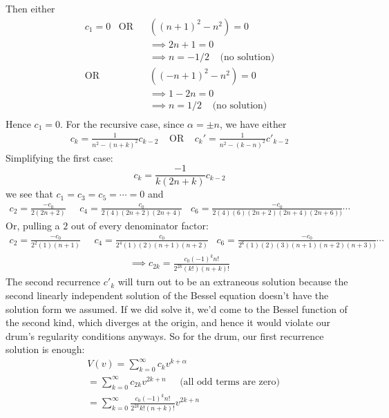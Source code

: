 \documentclass[12pt]{article}
\begin{document}
\begin{enumerate}[(a)]
{Then either
\begin{align*}
c_1 = 0 \;\;\; \text{OR} \;\;\; & ((n + 1)^2 - n^2) = 0\\
& \implies 2n + 1 = 0 \\
& \implies n = -1/2 \;\;\;\; \text{(no solution)} \\
\text{OR} \;\;\;& ((-n + 1)^2 - n^2) = 0 \\
& \implies 1 - 2n = 0 \\
& \implies n = 1/2\;\;\;\; \text{(no solution)} \\
\end{align*}
Hence $c_1 = 0$. For the recursive case, since $\alpha = \pm n$, we have either
\begin{align*}
c_k = \frac{1}{n^2 - (n + k)^2} c_{k-2} \;\;\;\; \text{OR} \;\;\;\; c_k' = \frac{1}{n^2 - (k - n)^2} c'_{k-2}
\end{align*}
Simplifying the first case:
$$c_k = \frac{-1}{k(2n + k)} c_{k-2}$$
we see that $c_1 = c_3 = c_5 = \cdots = 0$ and 
\begin{align*}
c_2 = \frac{-c_0}{2(2n+2)} \;\;\;\;\; c_4 = \frac{c_0}{2(4)(2n+2)(2n+4)}\;\;\; c_6 = \frac{-c_0}{2(4)(6)(2n+2)(2n+4)(2n+6))} \cdots
\end{align*}
Or, pulling a $2$ out of every denominator factor:
\begin{align*}
c_2 = \frac{-c_0}{2^2 (1) (n+1)} \;\;\;\;\; c_4 = \frac{c_0}{2^4 (1)(2) (n+1)(n+2)}\;\;\; c_6 = \frac{-c_0}{2^6 (1)(2)(3) (n+1)(n+2)(n+3))} \cdots
\end{align*}
\begin{align*}
\implies c_{2k} = \frac{c_0 (-1)^k n!}{2^{2k} (k!) (n+k)!}
\end{align*} 
The second recurrence $c'_{k}$ will turn out to be an extraneous solution because the second linearly independent solution of the Bessel equation doesn't have the solution form we assumed. If we did solve it, we'd come to the Bessel function of the second kind, which diverges at the origin, and hence it would violate our drum's regularity conditions anyways. So for the drum, our first recurrence solution is enough:
\begin{align*}
& V(v) = \sum_{k=0}^{\infty} c_k v^{k + \alpha} \\
&= \sum_{k=0}^{\infty} c_{2k} v^{2k + n} \;\;\;\;\; \text{(all odd terms are zero)} \\
&= \sum_{k=0}^{\infty} \frac{c_0 (-1)^k n!}{2^{2k} k! (n+k)!}  v^{2k + n} \\
\end{align*}
}
\end{enumerate}
\end{document}
